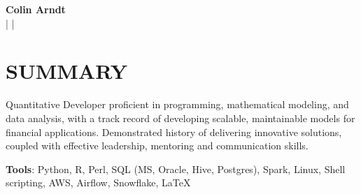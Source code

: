 \documentclass[letterpaper,11pt]{article}
\begin{document}
\begin{center}
    \textbf{\Huge Colin Arndt} \\ \vspace{5pt}
    \small 
    \faPhone \hspace{2pt}{858.281.3748} \hspace{1pt}|
    \hspace{1pt} \faEnvelope \hspace{3pt}{colin.f.arndt@gmail.com} \hspace{1pt}| 
    \hspace{1pt} \faLinkedin \hspace{3pt}{linkedin.com/in/colinarndt} \hspace{1pt} 


    \vspace{-3pt}
\end{center}

\section {SUMMARY}
 \begin{itemize}[leftmargin=0in, label={}]
    \small{\item{
      

       Quantitative Developer proficient in programming, mathematical modeling, and data analysis, with a track record of developing scalable, maintainable models for financial applications. Demonstrated history of delivering innovative solutions, coupled with effective leadership, mentoring and communication skills.  
    }}
 \end{itemize}


 \begin{itemize}[leftmargin=0in, label={}]
    \small{\item{
     \textbf{Tools}{: Python, R, Perl, SQL (MS, Oracle, Hive, Postgres), Spark, Linux, Shell scripting, AWS, Airflow, Snowflake, LaTeX}}} 
 \end{itemize}
 
\end{document}
